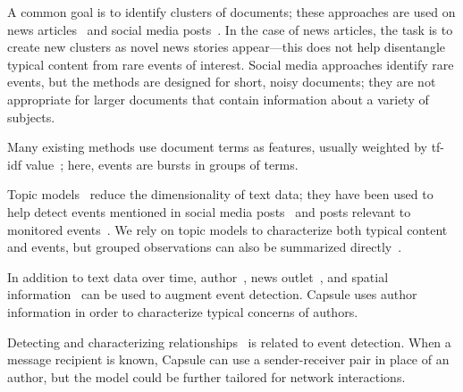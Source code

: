 A common goal is to identify clusters of documents; these approaches are used on news articles~\cite{zhao2012novel,zhao2007temporal,zhang2002novelty,li2005probabilistic,wang2007mining,allan1998line} and social media posts~\cite{VanDam:2012,lau2012line,jackoway2011identification,sakaki2010earthquake,reuter2012event,becker2010learning,sayyadi2009event}.  
In the case of news articles, the task is to create new clusters as novel news stories appear---this does not help disentangle typical content from rare events of interest.
Social media approaches identify rare events, but the methods are designed for short, noisy documents; they are not appropriate for larger documents that contain information about a variety of subjects.

Many existing methods use document terms as features, usually weighted by tf-idf value~\cite{fung2005parameter,kumaran2004text,brants2003system,das2011dynamic,zhao2007temporal,zhao2012novel}; here, events are bursts in groups of terms. %

Topic models~\cite{Blei:2012} reduce the dimensionality of text data; they have been used to help detect events mentioned in social media posts~\cite{lau2012line,dou2012leadline} and posts relevant to monitored events~\cite{VanDam:2012}.
We rely on topic models to characterize both typical content and events, but grouped observations can also be summarized directly~\cite{peng2007event,chakrabarti2011event,gao2012joint}.

In addition to text data over time, author~\cite{zhao2007temporal}, news outlet~\cite{wang2007mining}, and spatial information~\cite{Neill:2005,mathioudakis2010identifying,liu2011using} can be used to augment event detection.  Capsule uses author information in order to characterize typical concerns of authors.

Detecting and characterizing relationships~\cite{schein2015bayesian,linderman2014discovering,das2011dynamic} is related to event detection.  When a message recipient is known, Capsule can use a sender-receiver pair in place of an author, but the model could be further tailored for network interactions.

